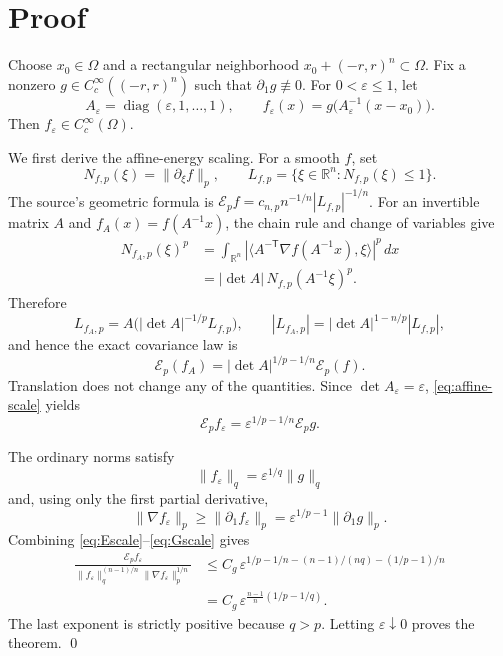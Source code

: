 \documentclass[11pt]{article}
\newcommand{\Ep}{\mathcal E_p}
\newcommand{\R}{\mathbb R}
\begin{document}
\section{Proof}

Choose $x_0\in\Omega$ and a rectangular neighborhood
$x_0+(-r,r)^n\subset\Omega$.  Fix a nonzero
$g\in C_c^\infty((-r,r)^n)$ such that $\partial_1g\not\equiv0$.  For
$0<\varepsilon\leq1$, let
\[
 A_\varepsilon=\operatorname{diag}(\varepsilon,1,\ldots,1),
 \qquad
 f_\varepsilon(x)=g\bigl(A_\varepsilon^{-1}(x-x_0)\bigr).
\]
Then $f_\varepsilon\in C_c^\infty(\Omega)$.

We first derive the affine-energy scaling.  For a smooth $f$, set
\[
 N_{f,p}(\xi)=\|\partial_\xi f\|_p,
 \qquad
 L_{f,p}=\{\xi\in\R^n:N_{f,p}(\xi)\leq1\}.
\]
The source's geometric formula is
\(
\Ep f=c_{n,p}n^{-1/n}|L_{f,p}|^{-1/n}
\).
For an invertible matrix $A$ and $f_A(x)=f(A^{-1}x)$, the chain rule and change
of variables give
\begin{align*}
 N_{f_A,p}(\xi)^p
 &=\int_{\R^n}
   |\langle A^{-\mathsf T}\nabla f(A^{-1}x),\xi\rangle|^p\,dx\\
 &=|\det A|\,N_{f,p}(A^{-1}\xi)^p.
\end{align*}
Therefore
\[
 L_{f_A,p}=A\bigl(|\det A|^{-1/p}L_{f,p}\bigr),
 \qquad
 |L_{f_A,p}|=|\det A|^{1-n/p}|L_{f,p}|,
\]
and hence the exact covariance law is
\begin{equation}\label{eq:affine-scale}
 \Ep(f_A)=|\det A|^{1/p-1/n}\Ep(f).
\end{equation}
Translation does not change any of the quantities.  Since
$\det A_\varepsilon=\varepsilon$, \eqref{eq:affine-scale} yields
\begin{equation}\label{eq:Escale}
 \Ep f_\varepsilon
 =\varepsilon^{1/p-1/n}\Ep g.
\end{equation}

The ordinary norms satisfy
\begin{equation}\label{eq:Lqscale}
 \|f_\varepsilon\|_q
 =\varepsilon^{1/q}\|g\|_q
\end{equation}
and, using only the first partial derivative,
\begin{equation}\label{eq:Gscale}
 \|\nabla f_\varepsilon\|_p
 \geq\|\partial_1f_\varepsilon\|_p
 =\varepsilon^{1/p-1}\|\partial_1g\|_p.
\end{equation}
Combining \eqref{eq:Escale}--\eqref{eq:Gscale} gives
\begin{align*}
 \frac{\Ep f_\varepsilon}
 {\|f_\varepsilon\|_q^{(n-1)/n}
  \|\nabla f_\varepsilon\|_p^{1/n}}
 &\leq C_g\,
 \varepsilon^{1/p-1/n-(n-1)/(nq)-(1/p-1)/n}\\
 &=C_g\,
 \varepsilon^{\frac{n-1}{n}(1/p-1/q)}.
\end{align*}
The last exponent is strictly positive because $q>p$.  Letting
$\varepsilon\downarrow0$ proves the theorem. \qed
\end{document}
